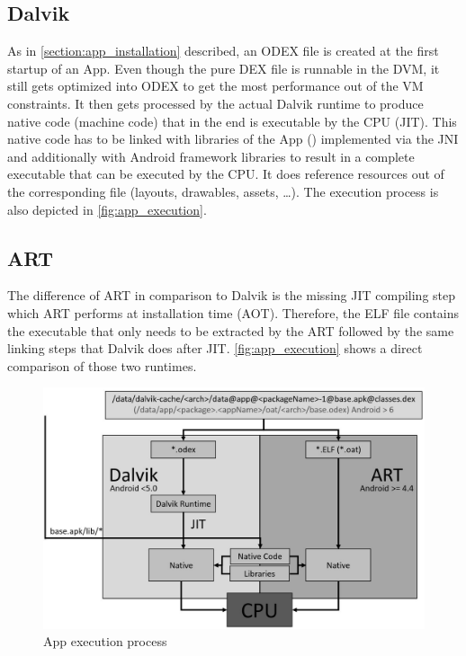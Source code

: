 \subsection{Dalvik}
As in \autoref{section:app_installation} described, an
ODEX file is created at the first startup of an App. Even though
the pure DEX file is runnable in the DVM, it still gets optimized
into ODEX to get the most performance out of the VM
constraints.
It then gets processed by the actual Dalvik runtime to produce
native code (machine code) that in the end is executable by the CPU (JIT).
This native code has to be linked with libraries of the App
() implemented via the JNI
and additionally with Android framework libraries to result in a complete
executable that can be executed by the CPU. It does
reference resources out of the corresponding  file (layouts,
drawables, assets, \ldots). The execution process is also depicted
in \autoref{fig:app_execution}.

\subsection{ART}
The difference of ART in comparison to Dalvik is the missing
JIT compiling step which ART performs at installation time
(AOT). Therefore, the ELF file contains the executable that
only needs to be extracted by the ART followed by the same
linking steps that Dalvik does after JIT. \autoref{fig:app_execution}
shows a direct comparison of those two runtimes.

\begin{figure}[htb]
  \includegraphics[width=\textwidth]{figures/app_execution}
  \caption[App execution process]{App execution process}
  \label{fig:app_execution}
\end{figure}
